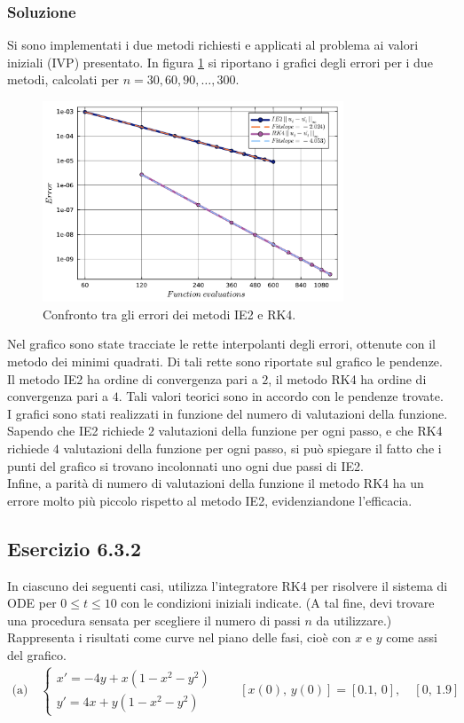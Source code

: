 \documentclass[letterpaper, 12pt]{article}
\numberwithin{equation}{section}    %
\begin{document}
\subsubsection{Soluzione}
Si sono implementati i due metodi richiesti e applicati al problema ai valori iniziali (IVP) presentato.
In figura \ref{fig:es6_3_1} si riportano i grafici degli errori per i due metodi,
calcolati per $n=30,60,90,\ldots,300$.
\begin{figure}[!ht]
    \centering
    \includegraphics[width=0.8\textwidth]{6311.pdf}
    \caption{Confronto tra gli errori dei metodi IE2 e RK4.}
    \label{fig:es6_3_1}
\end{figure}
Nel grafico sono state tracciate le rette interpolanti degli errori, ottenute con il metodo dei minimi quadrati. 
Di tali rette sono riportate sul grafico le pendenze. Il metodo IE2 ha ordine di convergenza pari a $2$, 
il metodo RK4 ha ordine di convergenza pari a $4$. Tali valori teorici sono in accordo con le pendenze trovate.\\
I grafici sono stati realizzati in funzione del numero di valutazioni della funzione. Sapendo che IE2 richiede $2$
valutazioni della funzione per ogni passo, e che RK4 richiede $4$ valutazioni della funzione per ogni passo,
si può spiegare il fatto che i punti del grafico si trovano incolonnati uno ogni due passi di IE2. \\
Infine, a parità di numero di valutazioni della funzione il metodo RK4 ha un errore molto più 
piccolo rispetto al metodo IE2, evidenziandone l'efficacia.

\subsection{Esercizio 6.3.2}
\label{es:6_3_2}
In ciascuno dei seguenti casi, utilizza l'integratore RK4 per risolvere il sistema di ODE per $0\le t \le 10$ 
con le condizioni iniziali indicate. (A tal fine, devi trovare una procedura sensata per scegliere il 
numero di passi $n$ da utilizzare.) Rappresenta i risultati come curve nel piano delle fasi, cioè con $x$ e $y$ 
come assi del grafico.
\begin{align*}
\text{(a)}\quad 
\begin{cases}
x' = -4y + x(1 - x^2 - y^2) \\
y' = 4x + y(1 - x^2 - y^2)
\end{cases}
\qquad
[x(0),\, y(0)] = [0.1,\, 0],\quad [0,\, 1.9]
\end{align*}
\end{document}
